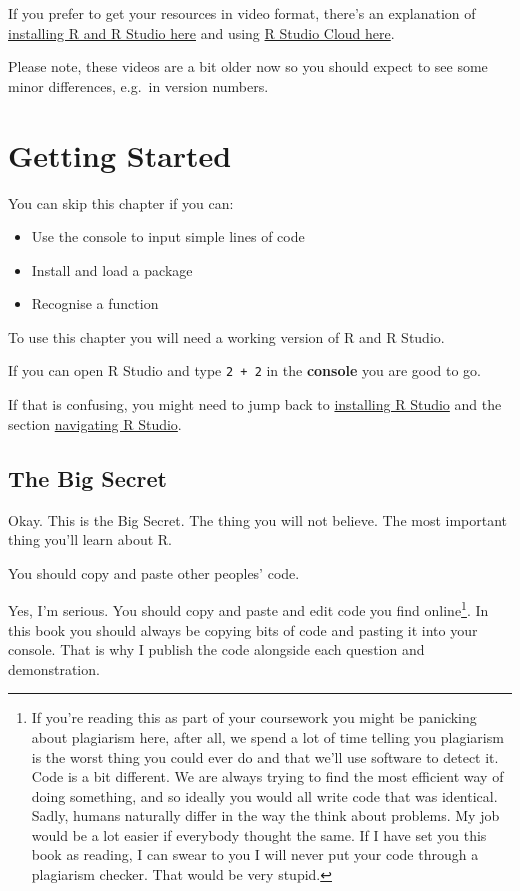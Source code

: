 \documentclass[
]{book}
\begin{document}
If you prefer to get your resources in video format, there's an explanation of \href{https://media.ed.ac.uk/media/R+ConversationsA+Installing+R+and+R+Studio/1_q0mdj8mk/104843251}{installing R and R Studio here} and using \href{https://media.ed.ac.uk/media/R+ConversationsA+R+Studio+Online/1_ex8u0oj7/112983051}{R Studio Cloud here}.

Please note, these videos are a bit older now so you should expect to see some minor differences, e.g.~in version numbers.

\hypertarget{start}{%
\chapter{Getting Started}\label{start}}

\begin{los}
You can skip this chapter if you can:

\begin{itemize}
\item
  Use the console to input simple lines of code
\item
  Install and load a package
\item
  Recognise a function
\end{itemize}
\end{los}

To use this chapter you will need a working version of R and R Studio.

If you can open R Studio and type \texttt{2\ +\ 2} in the \textbf{console} you are good to go.

If that is confusing, you might need to jump back to \protect\hyperlink{install_rs}{installing R Studio} and the section \protect\hyperlink{navigate_rs}{navigating R Studio}.

\hypertarget{thesecret}{%
\section{The Big Secret}\label{thesecret}}

Okay. This is the Big Secret. The thing you will not believe. The most important thing you'll learn about R.

\begin{hey}
You should copy and paste other peoples' code.
\end{hey}

Yes, I'm serious. You should copy and paste and edit code you find online\footnote{If you're reading this as part of your coursework you might be panicking about plagiarism here, after all, we spend a lot of time telling you plagiarism is the worst thing you could ever do and that we'll use software to detect it. Code is a bit different. We are always trying to find the most efficient way of doing something, and so ideally you would all write code that was identical. Sadly, humans naturally differ in the way the think about problems. My job would be a lot easier if everybody thought the same. If I have set you this book as reading, I can swear to you I will never put your code through a plagiarism checker. That would be very stupid.}. In this book you should always be copying bits of code and pasting it into your console. That is why I publish the code alongside each question and demonstration.
\end{document}
